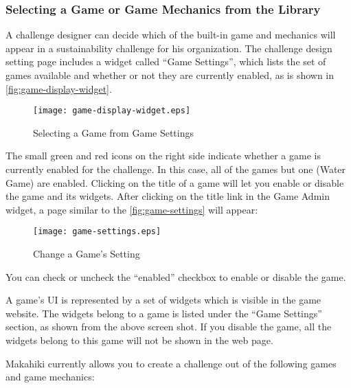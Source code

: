 \subsubsection{Selecting a Game or Game Mechanics from the Library}
A challenge designer can decide which of the built-in game and mechanics will appear in a sustainability challenge for his organization. The challenge design setting page includes a widget called ``Game Settings'', which lists the set of games available and whether or not they are currently enabled, as is shown in \autoref{fig:game-display-widget}.

\begin{figure}[!ht]
  \center
  \texttt{[image: game-display-widget.eps]}
  \caption{Selecting a Game from Game Settings}
  \label{fig:game-display-widget}
\end{figure}

The small green and red icons on the right side indicate whether a game is currently enabled for the challenge. In this case, all of the games but one (Water Game) are enabled. Clicking on the title of a game will let you enable or disable the game and its widgets. After clicking on the title link in the Game Admin widget, a page similar to the \autoref{fig:game-settings} will appear:

\begin{figure}[!ht]
  \center
  \texttt{[image: game-settings.eps]}
  \caption{Change a Game's Setting}
  \label{fig:game-settings}
\end{figure}

You can check or uncheck the ``enabled'' checkbox to enable or disable the game.

A game's UI is represented by a set of widgets which is visible in the game website. The widgets belong to a game is listed under the ``Game Settings'' section, as shown from the above screen shot. If you disable the game, all the widgets belong to this game will not be shown in the web page.

Makahiki currently allows you to create a challenge out of the following games and game mechanics:

